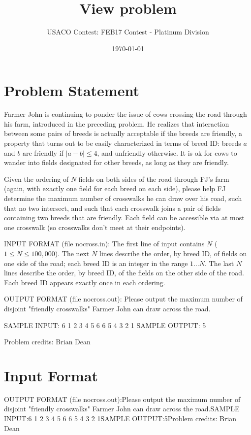 \documentclass[12pt]{article}
\title{View problem}
\author{USACO Contest: FEB17 Contest - Platinum Division}
\date{\today}
\begin{document}
\maketitle

\section*{Problem Statement}

Farmer John is continuing to ponder the issue of cows crossing the road through
his farm, introduced in the  preceding problem.  He realizes that interaction
between some pairs of breeds is actually acceptable if the breeds are friendly,
a property that turns out to be easily characterized in terms of breed ID:
breeds $a$ and $b$ are friendly if $|a - b| \leq 4$, and unfriendly otherwise. 
It is ok for cows to wander into fields designated for other breeds, as long as
they are friendly.

Given the ordering of $N$ fields on both sides of the road through FJ's farm
(again, with exactly one field for each breed on each side), please help FJ
determine the maximum number of crosswalks he can draw over his road, such that
no two intersect, and such that each crosswalk joins a pair of fields 
containing two breeds that are friendly.  Each field can be accessible
via at most one crosswalk (so crosswalks don't meet at their endpoints).

INPUT FORMAT (file nocross.in):
The first line of input contains $N$ ($1 \leq N \leq 100,000$).  The next $N$
lines describe the order, by breed ID, of fields on one side of the road; each
breed ID is an integer in the range $1 \ldots N$.  The last $N$ lines describe
the order, by  breed ID, of the fields on the other side of the road.  Each
breed ID appears exactly once in each ordering.

OUTPUT FORMAT (file nocross.out):
Please output the maximum number of disjoint "friendly crosswalks" Farmer John
can draw across the road.

SAMPLE INPUT:
6
1
2
3
4
5
6
6
5
4
3
2
1
SAMPLE OUTPUT: 
5


Problem credits: Brian Dean



\section*{Input Format}
OUTPUT FORMAT (file nocross.out):Please output the maximum number of disjoint "friendly crosswalks" Farmer John
can draw across the road.SAMPLE INPUT:6
1
2
3
4
5
6
6
5
4
3
2
1SAMPLE OUTPUT:5Problem credits: Brian Dean
\end{document}

